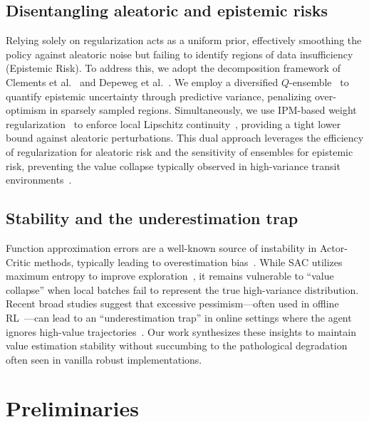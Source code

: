 \documentclass[10pt]{article}
\begin{document}
\subsection{Disentangling aleatoric and epistemic risks}
Relying solely on regularization acts as a uniform prior, effectively smoothing the policy against aleatoric noise but failing to identify regions of data insufficiency (Epistemic Risk). To address this, we adopt the decomposition framework of Clements et al.~\cite{Clements2019EstimatingRisk} and Depeweg et al.~\cite{Depeweg2018Decomposition}. We employ a diversified $Q$-ensemble~\cite{An2021UncertaintyEnsemble, Osband2016BootstrappedDQN} to quantify epistemic uncertainty through predictive variance, penalizing over-optimism in sparsely sampled regions. Simultaneously, we use IPM-based weight regularization~\cite{Zhou2023NaturalActorCritic} to enforce local Lipschitz continuity~\cite{Asadi2018Lipschitz}, providing a tight lower bound against aleatoric perturbations. This dual approach leverages the efficiency of regularization for aleatoric risk and the sensitivity of ensembles for epistemic risk, preventing the value collapse typically observed in high-variance transit environments~\cite{Ji2024SeizingSerendipity}.

\subsection{Stability and the underestimation trap}
Function approximation errors are a well-known source of instability in Actor-Critic methods, typically leading to overestimation bias~\cite{VanHasselt2010DoubleQ, Fujimoto2018TD3}. While SAC utilizes maximum entropy to improve exploration~\cite{Haarnoja2018SAC}, it remains vulnerable to ``value collapse'' when local batches fail to represent the true high-variance distribution. Recent broad studies suggest that excessive pessimism---often used in offline RL~\cite{Yang2022RORL, Kumar2020CQL}---can lead to an ``underestimation trap'' in online settings where the agent ignores high-value trajectories~\cite{Ji2024SeizingSerendipity}. Our work synthesizes these insights to maintain value estimation stability without succumbing to the pathological degradation often seen in vanilla robust implementations.

\section{Preliminaries}
\end{document}
